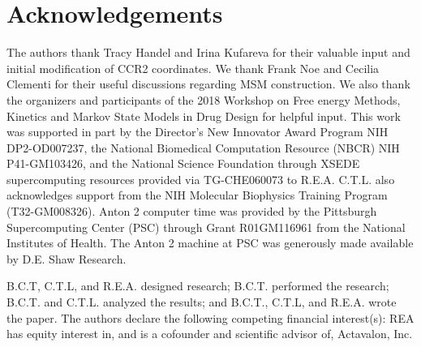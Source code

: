 \section{Acknowledgements}

\par {}

\par The authors thank Tracy Handel and Irina Kufareva for their valuable input and initial modification of CCR2 coordinates.
We thank Frank Noe and Cecilia Clementi for their useful discussions regarding MSM construction.
We also thank the organizers and participants of the 2018 Workshop on Free energy Methods, Kinetics and Markov State Models in Drug Design for helpful input.
This work was supported in part by the Director's New Innovator Award Program NIH DP2-OD007237, the National Biomedical Computation Resource (NBCR) NIH P41-GM103426, and the National Science Foundation through XSEDE supercomputing resources provided via TG-CHE060073 to R.E.A.
C.T.L. also acknowledges support from the NIH Molecular Biophysics Training Program (T32-GM008326).
Anton 2 computer time was provided by the Pittsburgh Supercomputing Center (PSC) through Grant R01GM116961 from the National Institutes of Health. The Anton 2 machine at PSC was generously made available by D.E. Shaw Research.

\par B.C.T, C.T.L, and R.E.A. designed research; B.C.T. performed the research; B.C.T. and C.T.L. analyzed the results; and B.C.T., C.T.L, and R.E.A. wrote the paper. The authors declare the following competing financial interest(s): REA has equity interest in, and is a cofounder and scientific advisor of, Actavalon, Inc.